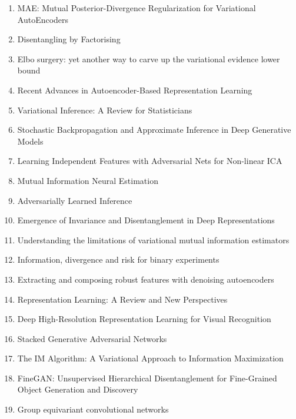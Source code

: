\documentclass[acmlarge]{acmart}
\begin{document}
\begin{enumerate}
	\item MAE: Mutual Posterior-Divergence Regularization for Variational AutoEncoders \cite{Ma2019MAEMP}
	\item Disentangling by Factorising \cite{Kim2018DisentanglingBF}
	\item Elbo surgery: yet another way to carve up the variational evidence lower bound \cite{hoffman2016elbo}
	\item Recent Advances in Autoencoder-Based Representation Learning \cite{Tschannen2018RecentAI}
	\item Variational Inference: A Review for Statisticians \cite{Blei2016VariationalIA}
	\item Stochastic Backpropagation and Approximate Inference in Deep Generative Models \cite{Rezende2014StochasticBA}
	\item Learning Independent Features with Adversarial Nets for Non-linear ICA \cite{Brakel2018LearningIF}
	\item Mutual Information Neural Estimation \cite{Belghazi2018MutualIN}
	\item Adversarially Learned Inference \cite{Dumoulin2017AdversariallyLI}
	\item Emergence of Invariance and Disentanglement in Deep Representations \cite{Achille2018EmergenceOI}
	\item Understanding the limitations of variational mutual information estimators \cite{song2019understanding}
	\item Information, divergence and risk for binary experiments \cite{reid2011information}
	\item Extracting and composing robust features with denoising autoencoders \cite{vincent2008extracting}
	\item Representation Learning: A Review and New Perspectives \cite{Bengio2013RepresentationLA}
	\item Deep High-Resolution Representation Learning for Visual Recognition \cite{Wang2020DeepHR}
	\item Stacked Generative Adversarial Networks \cite{Huang2017StackedGA}
	\item The IM Algorithm: A Variational Approach to Information Maximization \cite{Barber2003TheIA}
	\item FineGAN: Unsupervised Hierarchical Disentanglement for Fine-Grained Object Generation and Discovery \cite{Singh2019FineGANUH}
	\item Group equivariant convolutional networks \cite{cohen2016group}
\end{enumerate}
\newpage


\end{document}
